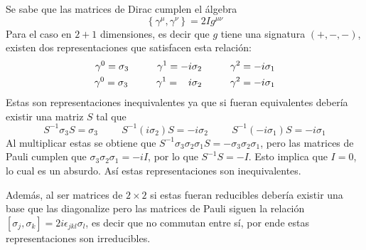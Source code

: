 Se sabe que las matrices de Dirac cumplen el álgebra
\begin{equation}
	\left\{\gamma^\mu,\gamma^\nu\right\} = 2I g^{\mu\nu}
\end{equation}
Para el caso en $2+1$ dimensiones, es decir que $g$ tiene una signatura $(+, -, -)$, existen dos representaciones que satisfacen esta relación:
\begin{align}
	\begin{split}
		\gamma^{0} = \sigma_3 \hspace{1cm} \gamma^{1} = -i\sigma_2\hspace{1cm} \gamma^{2} = -i\sigma_1\\
		\gamma^{0} = \sigma_3 \hspace{1cm} \gamma^{1} = \hspace{0.3cm}i\sigma_2 \hspace{1cm} \gamma^{2} = -i\sigma_1
	\end{split}\label{eq:DiracMatrices}
\end{align}
Estas son representaciones inequivalentes ya que si fueran equivalentes debería existir una matriz $S$ tal que
\begin{equation}
	S^{-1}\sigma_3 S = \sigma_3 \hspace{1cm} S^{-1}(i\sigma_2) S = -i\sigma_2 \hspace{1cm} S^{-1}(-i\sigma_1)S = -i\sigma_1
\end{equation}
Al multiplicar estas se obtiene que $S^{-1} \sigma_3\sigma_2\sigma_1 S = -\sigma_3\sigma_2\sigma_1$, pero las matrices de Pauli cumplen que $\sigma_3\sigma_2\sigma_1 = -iI$, por lo que $S^{-1} S = -I$. Esto implica que $I = 0$, lo cual es un absurdo. Así estas representaciones son inequivalentes.\par
Además, al ser matrices de $2\times 2$ si estas fueran reducibles debería existir una base que las diagonalize pero las matrices de Pauli siguen la relación $\left[\sigma_j,\sigma_k\right]= 2i\epsilon_{jkl}\sigma_{l}$, es decir que no commutan entre sí, por ende estas representaciones son irreducibles.

